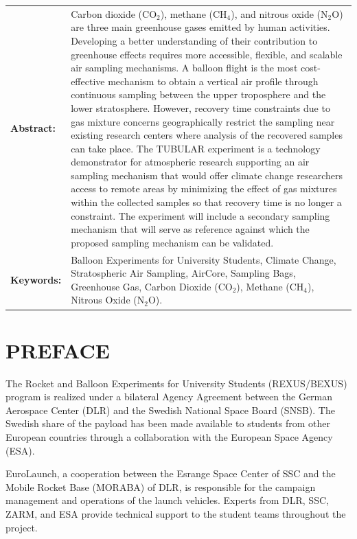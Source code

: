 \documentclass[a4paper,12pt,twoside]{article}
\begin{document}
\vspace{1cm}
\begin{tabular}{p{} p{}}
\textbf{Abstract:}     &  %
Carbon dioxide (CO$_{2}$), methane (CH$_{4}$), and nitrous oxide (N$_2$O) are three main greenhouse gases emitted by human activities. Developing a better understanding of their contribution to greenhouse effects requires more accessible, flexible, and scalable air sampling mechanisms. A balloon flight is the most cost-effective mechanism to obtain a vertical air profile through continuous sampling between the upper troposphere and the lower stratosphere. However, recovery time constraints due to gas mixture concerns geographically restrict the sampling near existing research centers where analysis of the recovered samples can take place. The TUBULAR experiment is a technology demonstrator for atmospheric research supporting an air sampling mechanism that would offer climate change researchers access to remote areas by minimizing the effect of gas mixtures within the collected samples so that recovery time is no longer a constraint. The experiment will include a secondary sampling mechanism that will serve as reference against which the proposed sampling mechanism can be validated.
  &  \\
\textbf{Keywords:}     & %
Balloon Experiments for University Students, Climate Change, Stratospheric Air Sampling, AirCore, Sampling Bags, Greenhouse Gas, Carbon Dioxide (CO$_{2}$), Methane (CH$_{4}$), Nitrous Oxide (N$_{2}$O).
\end{tabular}

\vfill

\newpage
\tableofcontents

\newpage
\section*{PREFACE} \markboth{}{}

The Rocket and Balloon Experiments for University Students (REXUS/BEXUS) program is realized under a bilateral Agency Agreement between the German Aerospace Center (DLR) and the Swedish National Space Board (SNSB). The Swedish share of the
payload has been made available to students from other European countries through a collaboration with the European Space Agency (ESA).

EuroLaunch, a cooperation between the Esrange Space Center of SSC and the Mobile Rocket Base (MORABA) of DLR, is responsible for the campaign management and operations of the launch vehicles. Experts from DLR, SSC, ZARM, and ESA provide
technical support to the student teams throughout the project.
\end{document}
